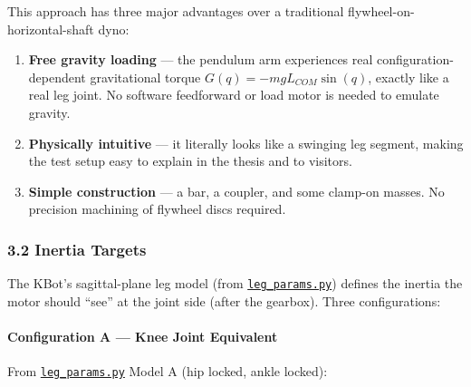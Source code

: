 \documentclass[
]{article}
\providecommand{\tightlist}{%
  \setlength{\itemsep}{0pt}\setlength{\parskip}{0pt}}
\begin{document}
This approach has three major advantages over a traditional
flywheel-on-horizontal-shaft dyno:

\begin{enumerate}
\def\labelenumi{\arabic{enumi}.}
\tightlist
\item
  \textbf{Free gravity loading} --- the pendulum arm experiences real
  configuration-dependent gravitational torque
  \(G(q) = -m g L_{COM} \sin(q)\), exactly like a real leg joint. No
  software feedforward or load motor is needed to emulate gravity.
\item
  \textbf{Physically intuitive} --- it literally looks like a swinging
  leg segment, making the test setup easy to explain in the thesis and
  to visitors.
\item
  \textbf{Simple construction} --- a bar, a coupler, and some clamp-on
  masses. No precision machining of flywheel discs required.
\end{enumerate}

\subsubsection{3.2 Inertia Targets}\label{inertia-targets}

The KBot's sagittal-plane leg model (from
\href{../../MuJoCo/kbot/leg_params.py}{\texttt{leg\_params.py}}) defines
the inertia the motor should ``see'' at the joint side (after the
gearbox). Three configurations:

\paragraph{Configuration A --- Knee Joint
Equivalent}\label{configuration-a-knee-joint-equivalent}

From \href{../../MuJoCo/kbot/leg_params.py}{\texttt{leg\_params.py}}
Model A (hip locked, ankle locked):
\end{document}
